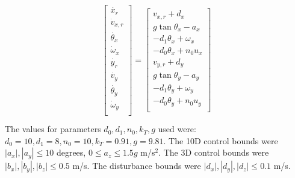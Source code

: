 \begin{equation}
\label{eq:Quad8DRel_dyn}
\begin{aligned}
\begin{array}{c}
\left[
\begin{array}{c}
\dot{x_r}\\
\dot v_{x,r}\\
\dot{\theta_{x}}\\
\dot\omega_{x}\\
\dot{y_r}\\
\dot{v_{y}}\\
\dot{\theta_{y}}\\
\dot\omega_{y}\\
\end{array}
\right]
=
\left[
\begin{array}{c}
v_{x,r} + d_x\\
g \tan \theta_x - a_x\\
-d_1 \theta_x + \omega_x\\
-d_0 \theta_x + n_0 u_x\\
v_{y,r} + d_y\\
g \tan \theta_y - a_y\\
-d_1 \theta_y + \omega_y\\
-d_0 \theta_y + n_0 u_y\\
\end{array}
\right]
\end{array}\\
\end{aligned}
\end{equation}
The values for parameters $d_0,d_1,n_0,k_T,g$ used were: $d_0=10,d_1=8,n_0=10,k_T=0.91,g=9.81$. The 10D control bounds were $|a_x|,|a_y|\leq10$ degrees, $0\leq a_z\leq 1.5g$ m/s$^{2}$. The 3D control bounds were $|b_x|,|b_y|,|b_z|\leq0.5$ m/s. The disturbance bounds were $|d_x|,|d_y|,|d_z|\leq0.1$ m/s.

